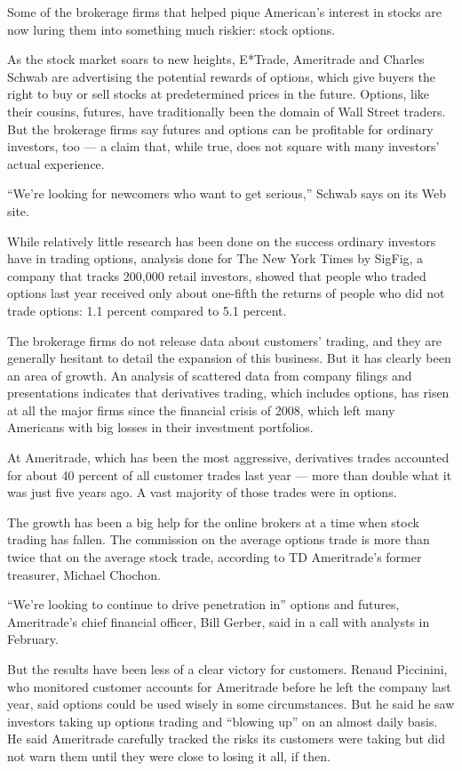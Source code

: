 Some of the brokerage firms that helped pique American's interest in
stocks are now luring them into something much riskier: stock options.

As the stock market soars to new heights, E*Trade, Ameritrade and
Charles Schwab are advertising the potential rewards of options, which
give buyers the right to buy or sell stocks at predetermined prices in
the future. Options, like their cousins, futures, have traditionally
been the domain of Wall Street traders. But the brokerage firms say
futures and options can be profitable for ordinary investors, too --- a
claim that, while true, does not square with many investors' actual
experience.

``We're looking for newcomers who want to get serious,'' Schwab says on
its Web site.

While relatively little research has been done on the success ordinary
investors have in trading options, analysis done for The New York Times
by SigFig, a company that tracks 200,000 retail investors, showed that
people who traded options last year received only about one-fifth the
returns of people who did not trade options: 1.1 percent compared to 5.1
percent.

The brokerage firms do not release data about customers' trading, and
they are generally hesitant to detail the expansion of this business.
But it has clearly been an area of growth. An analysis of scattered data
from company filings and presentations indicates that derivatives
trading, which includes options, has risen at all the major firms since
the financial crisis of 2008, which left many Americans with big losses
in their investment portfolios.

At Ameritrade, which has been the most aggressive, derivatives trades
accounted for about 40 percent of all customer trades last year --- more
than double what it was just five years ago. A vast majority of those
trades were in options.

The growth has been a big help for the online brokers at a time when
stock trading has fallen. The commission on the average options trade is
more than twice that on the average stock trade, according to TD
Ameritrade's former treasurer, Michael Chochon.

``We're looking to continue to drive penetration in'' options and
futures, Ameritrade's chief financial officer, Bill Gerber, said in a
call with analysts in February.

But the results have been less of a clear victory for customers. Renaud
Piccinini, who monitored customer accounts for Ameritrade before he left
the company last year, said options could be used wisely in some
circumstances. But he said he saw investors taking up options trading
and ``blowing up'' on an almost daily basis. He said Ameritrade
carefully tracked the risks its customers were taking but did not warn
them until they were close to losing it all, if then.

